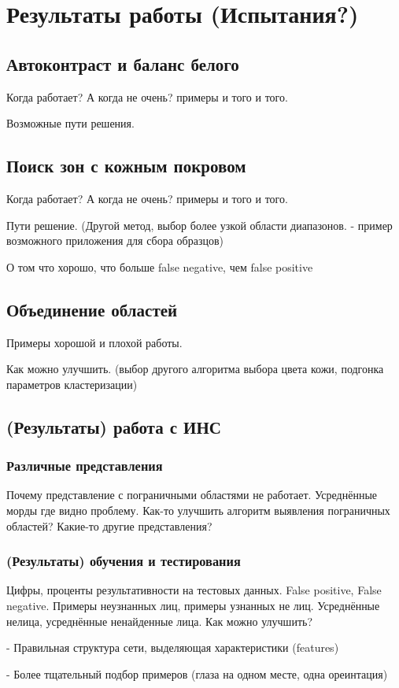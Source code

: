 \documentclass[12pt]{report}
\begin{document}
\chapter{Результаты работы (Испытания?)}
\section{Автоконтраст и баланс белого}
Когда работает? А когда не очень? примеры и того и того.

Возможные пути решения.
\section{Поиск зон с кожным покровом}
Когда работает? А когда не очень? примеры и того и того.

Пути решение. (Другой метод, выбор более узкой области диапазонов. - пример возможного приложения для сбора образцов)

О том что хорошо, что больше false negative, чем false positive
\section{Объединение областей}
Примеры хорошой и плохой работы.

Как можно улучшить. (выбор другого алгоритма выбора цвета кожи, подгонка параметров кластеризации)
\section{(Результаты) работа с ИНС}
\subsection{Различные представления}
Почему представление с пограничными областями не работает. Усреднённые морды где видно проблему. Как-то улучшить алгоритм выявления пограничных областей? Какие-то другие представления?
\subsection{(Результаты) обучения и тестирования}
Цифры, проценты результативности на тестовых данных. False positive, False negative. Примеры неузнанных лиц, примеры узнанных не лиц. Усреднённые нелица, усреднённые ненайденные лица.
Как можно улучшить?

- Правильная структура сети, выделяющая характеристики (features)

- Более тщательный подбор примеров (глаза на одном месте, одна ореинтация)
\end{document}
